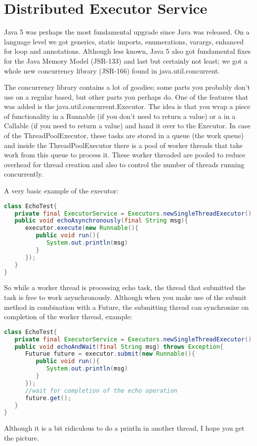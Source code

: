 \chapter{Distributed Executor Service}

Java 5 was perhaps the most fundamental upgrade since Java was released. On a language level we got generics, static imports, enumerations, varargs, enhanced for loop and annotations. Although less known, Java 5 also got fundamental fixes for the Java Memory Model (JSR-133) and last but certainly not least; we got a whole new concurrency library (JSR-166) found in java.util.concurrent.

The concurrency library contains a lot of goodies; some parts you probably don't use on a regular based, but other parts you perhaps do. One of the features that was added is the java.util.concurrent.Executor. The idea is that you wrap a piece of functionality in a Runnable (if you don't need to return a value) or a in a Callable (if you need to return a value) and hand it over to the Executor. In case of the ThreadPoolExecutor, these tasks are stored in a queue (the work queue) and inside the ThreadPoolExecutor there is a pool of worker threads that take work from this queue to process it. These worker threaded are pooled to reduce overhead for thread creation  and also to control the number of threads running concurrently.

A very basic example of the executor:
\begin{lstlisting}[language=java]
class EchoTest{
   private final ExecutorService = Executors.newSingleThreadExecutor();
   public void echoAsynchronously(final String msg){
      executor.execute(new Runnable(){
         public void run(){
            System.out.println(msg)
         }
      });	
   }
}
\end{lstlisting}
So while a worker thread is processing echo task, the thread that submitted the task is free to work asynchronously. Although when you make use of the submit method in combination with a Future, the submitting thread can synchronize on completion of the worker thread, example:
\begin{lstlisting}[language=java]
class EchoTest{
   private final ExecutorService = Executors.newSingleThreadExecutor();
   public void echoAndWait(final String msg) throws Exception{
      Futurue future = executor.submit(new Runnable(){
         public void run(){
            System.out.println(msg)
         }
      });	
      //wait for completion of the echo operation
	  future.get();
   }
}
\end{lstlisting}
Although it is a bit ridiculous to do a println in another thread, I hope you get the picture.

